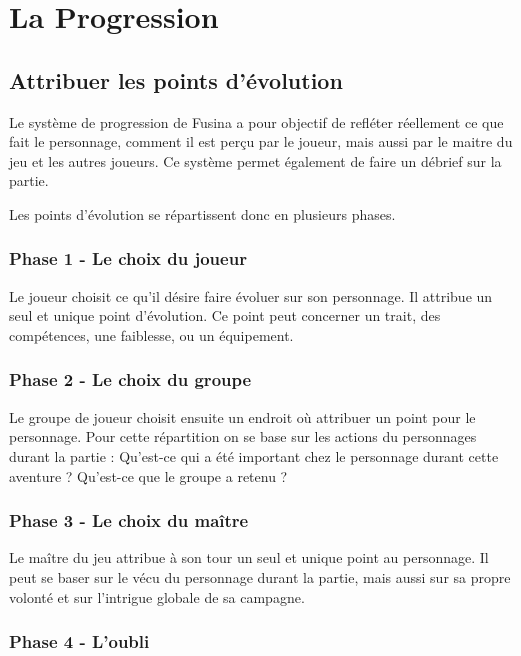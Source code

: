 \chapter{La Progression}

\begin{multicols}{2}

\section{Attribuer les points d'évolution}

Le système de progression de Fusina a pour objectif de refléter réellement ce que fait le personnage, comment il est perçu par le joueur, mais aussi par le maitre du jeu et les autres joueurs. Ce système permet également de faire un débrief sur la partie.

Les points d'évolution se répartissent donc en plusieurs phases.
\subsection{Phase 1 - Le choix du joueur}

Le joueur choisit ce qu'il désire faire évoluer sur son personnage. Il attribue un seul et unique point d'évolution. Ce point peut concerner un trait, des compétences, une faiblesse, ou un équipement.

\subsection{Phase 2 - Le choix du groupe}

Le groupe de joueur choisit ensuite un endroit où attribuer un point pour le personnage. Pour cette répartition on se base sur les actions du personnages durant la partie : Qu'est-ce qui a été important chez le personnage durant cette aventure ? Qu'est-ce que le groupe a retenu ?

\subsection{Phase 3 - Le choix du maître}

Le maître du jeu attribue à son tour un seul et unique point au personnage. Il peut se baser sur le vécu du personnage durant la partie, mais aussi sur sa propre volonté et sur l'intrigue globale de sa campagne.

\subsection{Phase 4 - L'oubli}


\end{multicols}
